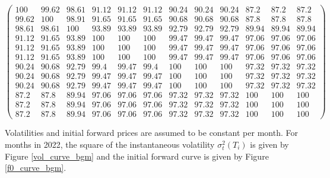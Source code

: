 \documentclass{article}
\numberwithin{equation}{section}
\begin{document}
$$\begin{pmatrix}
100 & 99.62 & 98.61 & 91.12 & 91.12 & 91.12 & 90.24 & 90.24 & 90.24 & 87.2 & 87.2 & 87.2\\
99.62 & 100 & 98.91 & 91.65 & 91.65 & 91.65 & 90.68 & 90.68 & 90.68 & 87.8 & 87.8 & 87.8\\
98.61 & 98.61 & 100 & 93.89 & 93.89 & 93.89 & 92.79 & 92.79 & 92.79 & 89.94 & 89.94 & 89.94\\
91.12 & 91.65 & 93.89 & 100 & 100 & 100 & 99.47 & 99.47 & 99.47 & 97.06 & 97.06 & 97.06\\
91.12 & 91.65 & 93.89 & 100 & 100 & 100 & 99.47 & 99.47 & 99.47 & 97.06 & 97.06 & 97.06\\
91.12 & 91.65 & 93.89 & 100 & 100 & 100 & 99.47 & 99.47 & 99.47 & 97.06 & 97.06 & 97.06\\
90.24 & 90.68 & 92.79 & 99.4 & 99.47 & 99.4 & 100 & 100 & 100 & 97.32 & 97.32 & 97.32\\
90.24 & 90.68 & 92.79 & 99.47 & 99.47 & 99.47 & 100 & 100 & 100 & 97.32 & 97.32 & 97.32\\
90.24 & 90.68 & 92.79 & 99.47 & 99.47 & 99.47 & 100  & 100 & 100 & 97.32 & 97.32 & 97.32\\
87.2 & 87.8 & 89.94 & 97.06 & 97.06 & 97.06 & 97.32 & 97.32 & 97.32 &100 & 100& 100\\
87.2 & 87.8 & 89.94 & 97.06 & 97.06 & 97.06 & 97.32 & 97.32 & 97.32 &100& 100 & 100\\
87.2 & 87.8 & 89.94 & 97.06 & 97.06 & 97.06 & 97.32 & 97.32 & 97.32 & 100 & 100 & 100
\end{pmatrix}$$

\vspace{0.3cm}

\noindent
Volatilities and initial forward prices are assumed to be constant per month. For months in 2022, the square of the instantaneous volatility $\sigma^2_t(T_i)$ is given by Figure \ref{vol_curve_bgm} and the initial forward curve is given by Figure \ref{f0_curve_bgm}.
\end{document}
